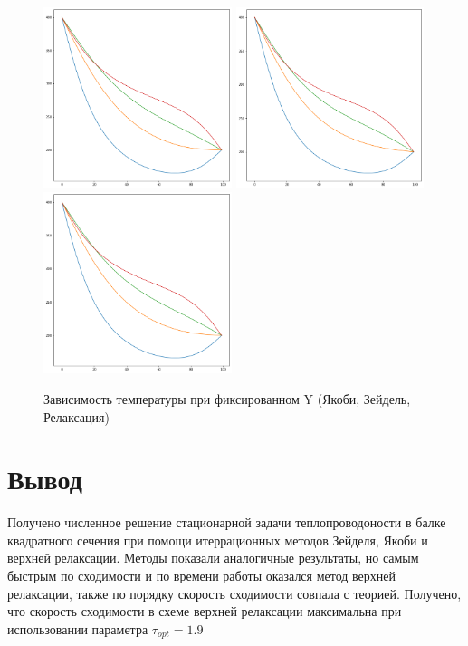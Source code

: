 \documentclass[20pt]{article}
\begin{document}
    \begin{figure}[h!]
        \centering
        \includegraphics[width=55mm]{y_jacobi.png}
        \includegraphics[width=55mm]{y_seidel.png}
        \includegraphics[width=55mm]{y_relax.png}
        \caption{Зависимость температуры при фиксированном Y (Якоби, Зейдель, Релаксация)}
        \label{setup}
    \end{figure}

\section{Вывод}
Получено численное решение стационарной задачи теплопроводоности в балке квадратного сечения при помощи итеррационных методов Зейделя, Якоби и верхней релаксации. Методы показали аналогичные результаты, но самым быстрым по сходимости и по времени работы оказался метод верхней релаксации, также по порядку скорость сходимости совпала с теорией. Получено, что скорость сходимости в схеме верхней релаксации максимальна при использовании параметра $\tau_{opt} = 1.9 $  
\newpage
\end{document}
